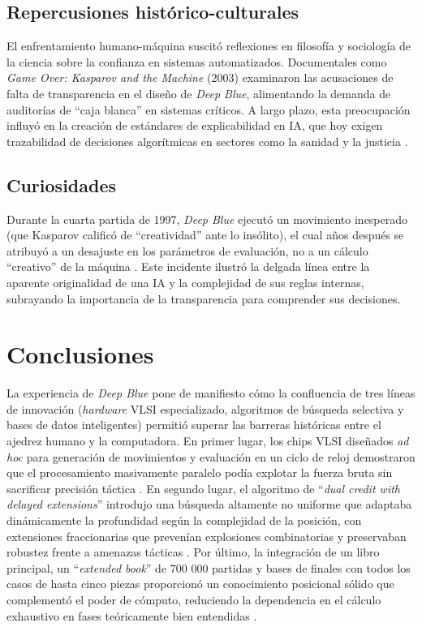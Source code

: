 \documentclass[a4paper, 12pt]{article}
\begin{document}
\subsection{Repercusiones histórico-culturales}

El enfrentamiento humano-máquina suscitó reflexiones en filosofía y 
sociología de la ciencia sobre la confianza en sistemas automatizados. 
Documentales como \emph{Game Over: Kasparov and the Machine} (2003) 
examinaron las acusaciones de falta de transparencia en el diseño de 
\textit{Deep Blue}, alimentando la demanda de auditorías de “caja 
blanca” en sistemas críticos. A largo plazo, 
esta preocupación influyó en la creación de estándares de 
explicabilidad en IA, que hoy exigen trazabilidad de decisiones 
algorítmicas en sectores como la sanidad y la justicia 
\cite{korf1997does,bory2019deep}.

\subsection{Curiosidades}

Durante la cuarta partida de 1997, \textit{Deep Blue} ejecutó un 
movimiento inesperado (que Kasparov calificó de “creatividad” 
ante lo insólito), el cual años después se atribuyó a un desajuste 
en los parámetros de evaluación, no a un cálculo “creativo” de la 
máquina \cite{latson2015}. Este incidente ilustró la delgada línea 
entre la aparente originalidad de una IA y la complejidad de sus 
reglas internas, subrayando la importancia de la transparencia para 
comprender sus decisiones.




\newpage
\section{Conclusiones}


La experiencia de \textit{Deep Blue} pone de manifiesto cómo la 
confluencia de tres líneas de innovación (\emph{hardware} VLSI 
especializado, algoritmos de búsqueda selectiva y bases de datos 
inteligentes) permitió superar las barreras históricas entre el 
ajedrez humano y la computadora. En primer lugar, los chips 
VLSI diseñados \emph{ad hoc} para generación de movimientos y 
evaluación en un ciclo de reloj demostraron que el procesamiento 
masivamente paralelo podía explotar la fuerza bruta sin 
sacrificar precisión táctica \cite{campbell2002deep}. 
En segundo lugar, el algoritmo de “\emph{dual credit with delayed 
extensions}” introdujo una búsqueda altamente no uniforme que 
adaptaba dinámicamente la profundidad según la complejidad de 
la posición, con extensiones fraccionarias que prevenían 
explosiones combinatorias y preservaban robustez frente a 
amenazas tácticas \cite{aung2010}. Por último, la 
integración de un libro principal, un “\emph{extended book}” de 700 000 
partidas y bases de finales con todos los casos de hasta cinco 
piezas proporcionó un conocimiento posicional sólido que 
complementó el poder de cómputo, reduciendo la dependencia en 
el cálculo exhaustivo en fases teóricamente bien entendidas 
\cite{greenemeier2017}.
\end{document}
